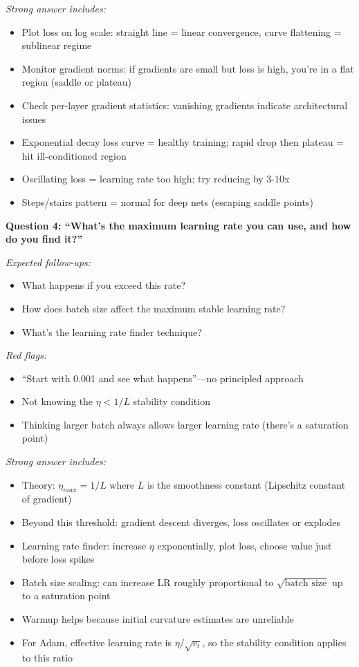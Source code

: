 \documentclass[../../main.tex]{subfiles}
\begin{document}
\begin{interviewquestions}
\textit{Strong answer includes:}
\begin{itemize}
    \item Plot loss on log scale: straight line = linear convergence, curve flattening = sublinear regime
    \item Monitor gradient norms: if gradients are small but loss is high, you're in a flat region (saddle or plateau)
    \item Check per-layer gradient statistics: vanishing gradients indicate architectural issues
    \item Exponential decay loss curve = healthy training; rapid drop then plateau = hit ill-conditioned region
    \item Oscillating loss = learning rate too high; try reducing by 3-10x
    \item Steps/stairs pattern = normal for deep nets (escaping saddle points)
\end{itemize}

\textbf{Question 4: ``What's the maximum learning rate you can use, and how do you find it?''}

\textit{Expected follow-ups:}
\begin{itemize}
    \item What happens if you exceed this rate?
    \item How does batch size affect the maximum stable learning rate?
    \item What's the learning rate finder technique?
\end{itemize}

\textit{Red flags:}
\begin{itemize}
    \item ``Start with 0.001 and see what happens''---no principled approach
    \item Not knowing the $\eta < 1/L$ stability condition
    \item Thinking larger batch always allows larger learning rate (there's a saturation point)
\end{itemize}

\textit{Strong answer includes:}
\begin{itemize}
    \item Theory: $\eta_{max} = 1/L$ where $L$ is the smoothness constant (Lipschitz constant of gradient)
    \item Beyond this threshold: gradient descent diverges, loss oscillates or explodes
    \item Learning rate finder: increase $\eta$ exponentially, plot loss, choose value just before loss spikes
    \item Batch size scaling: can increase LR roughly proportional to $\sqrt{\text{batch size}}$ up to a saturation point
    \item Warmup helps because initial curvature estimates are unreliable
    \item For Adam, effective learning rate is $\eta/\sqrt{v_t}$, so the stability condition applies to this ratio
\end{itemize}


\end{interviewquestions}
\end{document}
